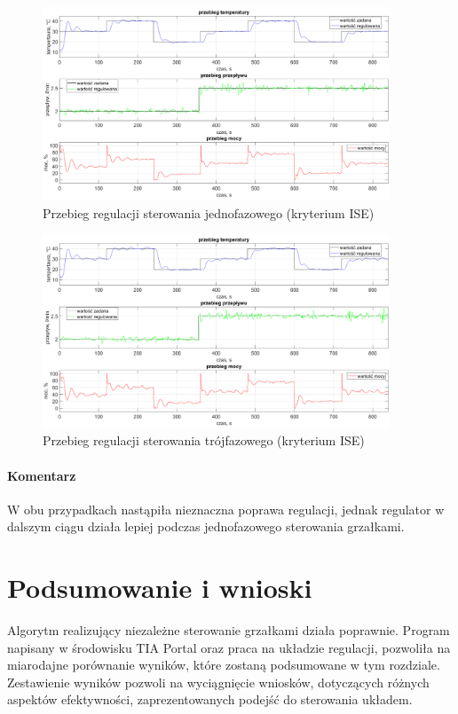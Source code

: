 \documentclass[a4paper,twoside,12pt]{book}
\begin{document}
\begin{figure}[h]
	\centering
	\includegraphics[width=0.92\textwidth]{./wykresy/png/regulation(ISE)OnePhase.png}
	\caption{Przebieg regulacji sterowania jednofazowego (kryterium ISE)}
	\label{fig:ISE jednofazowy}
\end{figure}

\newpage
\begin{figure}[h]
	\centering
	\includegraphics[width=0.92\textwidth]{./wykresy/png/regulation(ISE)ThreePhase.png}
	\caption{Przebieg regulacji sterowania trójfazowego (kryterium ISE)}
	\label{fig:ISE trójfazowy}
\end{figure}

\subsubsection{Komentarz}
W obu przypadkach nastąpiła nieznaczna poprawa regulacji, jednak regulator w dalszym ciągu działa lepiej podczas jednofazowego sterowania grzałkami.

\chapter{Podsumowanie i wnioski}
\label{ch:07}
Algorytm realizujący niezależne sterowanie grzałkami działa poprawnie. Program napisany w środowisku TIA Portal oraz praca na układzie regulacji, pozwoliła na miarodajne porównanie wyników, które zostaną podsumowane w tym rozdziale. Zestawienie wyników pozwoli na wyciągnięcie wniosków, dotyczących różnych aspektów efektywności, zaprezentowanych podejść do sterowania układem.
\end{document}
